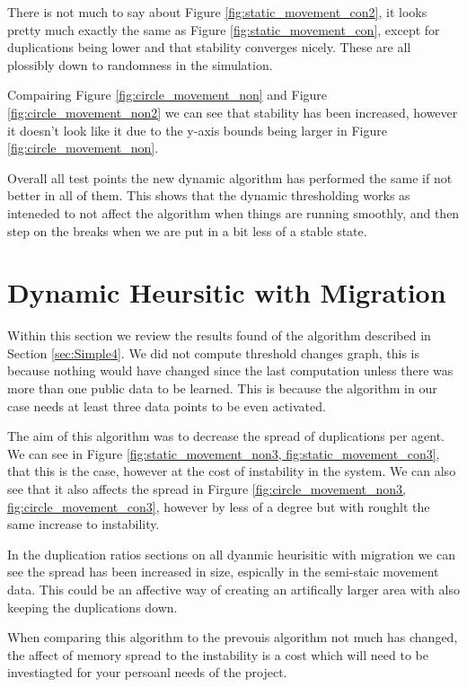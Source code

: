 \documentclass{UoYCSproject}
\begin{document}
There is not much to say about Figure \ref{fig:static_movement_con2}, it looks pretty much exactly the same as Figure \ref{fig:static_movement_con}, except for duplications being lower and that stability converges nicely.
These are all plossibly down to randomness in the simulation.

Compairing Figure \ref{fig:circle_movement_non} and Figure \ref{fig:circle_movement_non2} we can see that stability has been increased, however it doesn't look like it due to the y-axis bounds being larger in Figure \ref{fig:circle_movement_non}.

Overall all test points the new dynamic algorithm has performed the same if not better in all of them.
This shows that the dynamic thresholding works as inteneded to not affect the algorithm when things are running smoothly, and then step on the breaks when we are put in a bit less of a stable state.


\section{Dynamic Heursitic with Migration}
\label{sec:Simple4a}

Within this section we review the results found of the algorithm described in Section \ref{sec:Simple4}.
We did not compute threshold changes graph, this is because nothing would have changed since the last computation unless there was more than one public data to be learned.
This is because the algorithm in our case needs at least three data points to  be even activated.

The aim of this algorithm was to decrease the spread of duplications per agent.
We can see in Figure \ref{fig:static_movement_non3, fig:static_movement_con3}, that this is the case, however at the cost of instability in the system.
We can also see that it also affects the spread in Firgure \ref{fig:circle_movement_non3, fig:circle_movement_con3}, however by less of a degree but with roughlt the same increase to instability.

In the duplication ratios sections on all dyanmic heurisitic with migration we can see the spread has been increased in size, espically in the semi-staic movement data.
This could be an affective way of creating an artifically larger area with also keeping the duplications down.

When comparing this algorithm to the prevouis algorithm not much has changed, the affect of memory spread to the instability is a cost which will need to be investiagted for your persoanl needs of the project.
\end{document}
